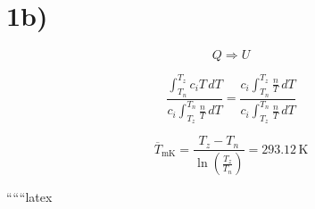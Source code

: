 

\section*{1b)}

\[ Q \Rightarrow U \]

\[
\frac{\int_{T_n}^{T_z} c_i T \, dT}{c_i \int_{T_z}^{T_n} \frac{n}{T} \, dT} = \frac{c_i \int_{T_n}^{T_z} \frac{n}{T} \, dT}{c_i \int_{T_z}^{T_n} \frac{n}{T} \, dT}
\]

\[
\overline{T}_{\text{mK}} = \frac{T_z - T_n}{\ln \left( \frac{T_z}{T_n} \right)} = 293.12 \, \text{K}
\]

``````latex